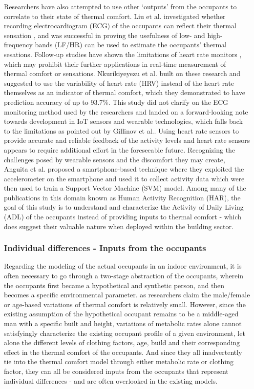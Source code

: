 	Researchers have also attempted to use other `outputs' from the occupants to correlate to their state of thermal comfort. Liu et al. investigated whether recording electrocardiogram (ECG) of the occupants can reflect their thermal sensation \cite{liu_heart_2008}, and was successful in proving the usefulness of low- and high-frequency bands (LF/HR) can be used to estimate the occupants' thermal sesations. Follow-up studies have shown the limitations of heart rate monitors \cite{gillinov_variable_2017}, which may prohibit their further applications in real-time measurement of thermal comfort or sensations. Nkurikiyeyezu et al. built on these research and suggested to use the variability of heart rate (HRV) instead of the heart rate themselves as an indicator of thermal comfort, which they demonstrated to have prediction accuracy of up to 93.7\%. This study did not clarify on the ECG monitoring method used by the researchers and landed on a forward-looking note towards development in IoT sensors and wearable technologies, which falls back to the limitations as pointed out by Gillinov et al.\cite{gillinov_variable_2017}. Using heart rate sensors to provide accurate and reliable feedback of the activity levels and heart rate sensors appears to require additional effort in the foreseeable future. 
	Recognizing the challenges posed by wearable sensors and the discomfort they may create, Anguita et al. proposed a smartphone-based technique where they exploited the accelerometer on the smartphone and used it to collect activity data which were then used to train a Support Vector Machine (SVM) model. Among many of the publications in this domain known as Human Activity Recognition (HAR), the goal of this study is to understand and characterize the Activity of Daily Living (ADL) of the occupants instead of providing inputs to thermal comfort - which does suggest their valuable nature when deployed within the building sector. 

\subsubsection{Individual differences - Inputs from the occupants}
	Regarding the modeling of the actual occupants in an indoor environment, it is often necessary to go through a two-stage abstraction of the occupants, wherein the occupants first became a hypothetical and synthetic person, and then becomes a specific environmental parameter.  as researchers claim the male/female or age-based variations of thermal comfort is relatively small. However, since the existing assumption of the hypothetical occupant remains to be a middle-aged man with a specific built and height, variations of metabolic rates alone cannot satisfyingly characterize the existing occupant profile of a given environment, let alone the different levels of clothing factors, age, build and their corresponding effect in the thermal comfort of the occupants. And since they all inadvertently tie into the thermal comfort model through either metabolic rate or clothing factor, they can all be considered inputs from the occupants that represent individual differences - and are often overlooked in the existing models. 

